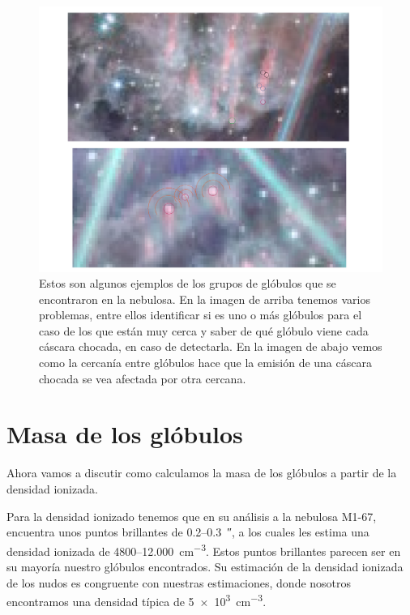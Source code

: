 \documentclass{book}
\begin{document}
\begin{figure}[htb]
    \centering
    \includegraphics[width=\textwidth]{discusion/groups_globules.pdf}
    \caption{Estos son algunos ejemplos de los grupos de glóbulos que se encontraron en la nebulosa. En la imagen de arriba tenemos varios problemas, entre ellos identificar si es uno o más glóbulos para el caso de los que están muy cerca y saber de qué glóbulo viene cada cáscara chocada, en caso de detectarla. En la imagen de abajo vemos como la cercanía entre glóbulos hace que la emisión de una cáscara chocada se vea afectada por otra cercana.}
    \label{globule_group}
\end{figure}

\section{Masa de los glóbulos}\label{app:masa_glo}

Ahora vamos a discutir como calculamos la masa de los glóbulos a partir de la densidad ionizada.

Para la densidad ionizado tenemos que \cite{Grosdidier:1998} en su análisis a la nebulosa M1-67, encuentra unos puntos brillantes de 0.2--\SI{0.3}{\arcsecond}, a los cuales les estima una densidad ionizada de 4800--\SI{12,000}{cm^{-3}}. Estos puntos brillantes parecen ser en su mayoría nuestro glóbulos encontrados. Su estimación de la densidad ionizada de los nudos es congruente con nuestras estimaciones, donde nosotros encontramos una densidad típica de \SI{5e3}{cm^{-3}}.  
\end{document}
